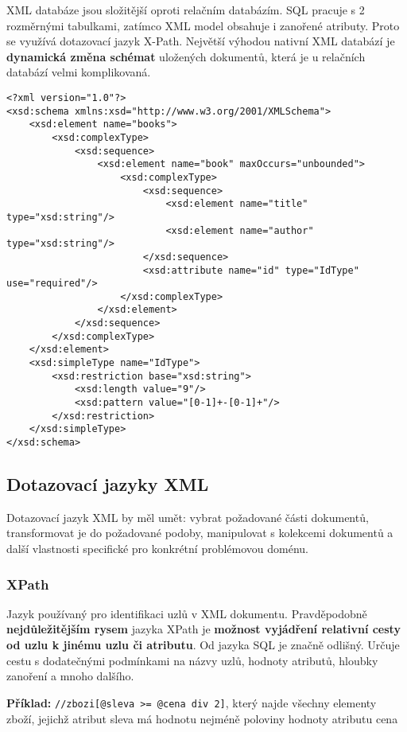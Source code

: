 XML databáze jsou složitější oproti relačním databázím. SQL pracuje s 2 rozměrnými tabulkami, zatímco XML model obsahuje i zanořené atributy. Proto se využívá dotazovací jazyk X-Path. Největší výhodou nativní XML databází je \textbf{dynamická změna schémat} uložených dokumentů, která je u relačních databází velmi komplikovaná.

\begin{verbatim}
<?xml version="1.0"?>
<xsd:schema xmlns:xsd="http://www.w3.org/2001/XMLSchema">
    <xsd:element name="books">
        <xsd:complexType>
            <xsd:sequence>
                <xsd:element name="book" maxOccurs="unbounded">
                    <xsd:complexType>
                        <xsd:sequence>
                            <xsd:element name="title" type="xsd:string"/>
                            <xsd:element name="author" type="xsd:string"/>
                        </xsd:sequence>
                        <xsd:attribute name="id" type="IdType" use="required"/>
                    </xsd:complexType>
                </xsd:element>
            </xsd:sequence>
        </xsd:complexType>
    </xsd:element>
    <xsd:simpleType name="IdType">
        <xsd:restriction base="xsd:string">
            <xsd:length value="9"/>
            <xsd:pattern value="[0-1]+-[0-1]+"/>
        </xsd:restriction>
    </xsd:simpleType>
</xsd:schema>
\end{verbatim}

\subsection{Dotazovací jazyky XML}
Dotazovací jazyk XML by měl umět: vybrat požadované části dokumentů, transformovat je do požadované podoby, manipulovat s kolekcemi dokumentů a další vlastnosti specifické pro konkrétní problémovou doménu.

\subsubsection{XPath}
Jazyk používaný pro identifikaci uzlů v XML dokumentu. Pravděpodobně \textbf{nejdůležitějším rysem} jazyka XPath je \textbf{možnost vyjádření relativní cesty od uzlu k jinému uzlu či atributu}. Od jazyka SQL je značně odlišný. Určuje cestu s dodatečnými podmínkami na názvy uzlů, hodnoty atributů, hloubky zanoření a mnoho dalšího.

\textbf{Příklad:} \texttt{//zbozi[@sleva >= @cena div 2]}, který najde všechny elementy zboží, jejichž atribut sleva má hodnotu nejméně poloviny hodnoty atributu cena

